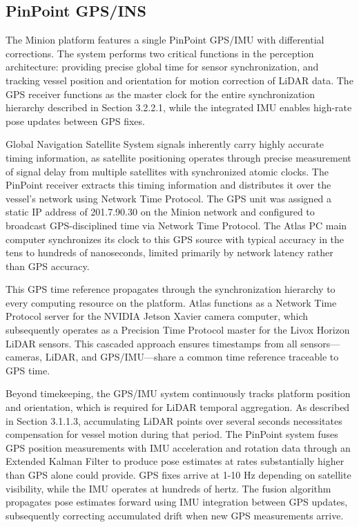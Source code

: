 \documentclass{erauthesis}
\begin{document}
        \subsection{PinPoint GPS/INS} \label{sensors_GPS}

The Minion platform features a single PinPoint \ac{GPS}/\ac{IMU} with differential corrections.
The system performs two critical functions in the perception architecture: providing precise global time for sensor synchronization, and tracking vessel position and orientation for motion correction of \ac{LiDAR} data.
The \ac{GPS} receiver functions as the master clock for the entire synchronization hierarchy described in Section 3.2.2.1, while the integrated \ac{IMU} enables high-rate pose updates between \ac{GPS} fixes.

Global Navigation Satellite System signals inherently carry highly accurate timing information, as satellite positioning operates through precise measurement of signal delay from multiple satellites with synchronized atomic clocks.
The PinPoint receiver extracts this timing information and distributes it over the vessel's network using Network Time Protocol.
The \ac{GPS} unit was assigned a static IP address of 201.7.90.30 on the Minion network and configured to broadcast \ac{GPS}-disciplined time via Network Time Protocol.
The Atlas PC main computer synchronizes its clock to this \ac{GPS} source with typical accuracy in the tens to hundreds of nanoseconds, limited primarily by network latency rather than \ac{GPS} accuracy.

This \ac{GPS} time reference propagates through the synchronization hierarchy to every computing resource on the platform.
Atlas functions as a Network Time Protocol server for the NVIDIA Jetson Xavier camera computer, which subsequently operates as a Precision Time Protocol master for the Livox Horizon \ac{LiDAR} sensors.
This cascaded approach ensures timestamps from all sensors—cameras, \ac{LiDAR}, and \ac{GPS}/\ac{IMU}—share a common time reference traceable to \ac{GPS} time.

Beyond timekeeping, the \ac{GPS}/\ac{IMU} system continuously tracks platform position and orientation, which is required for \ac{LiDAR} temporal aggregation.
As described in Section 3.1.1.3, accumulating \ac{LiDAR} points over several seconds necessitates compensation for vessel motion during that period.
The PinPoint system fuses \ac{GPS} position measurements with \ac{IMU} acceleration and rotation data through an Extended Kalman Filter to produce pose estimates at rates substantially higher than \ac{GPS} alone could provide.
\ac{GPS} fixes arrive at 1-10 Hz depending on satellite visibility, while the \ac{IMU} operates at hundreds of hertz.
The fusion algorithm propagates pose estimates forward using \ac{IMU} integration between \ac{GPS} updates, subsequently correcting accumulated drift when new \ac{GPS} measurements arrive.
\end{document}
